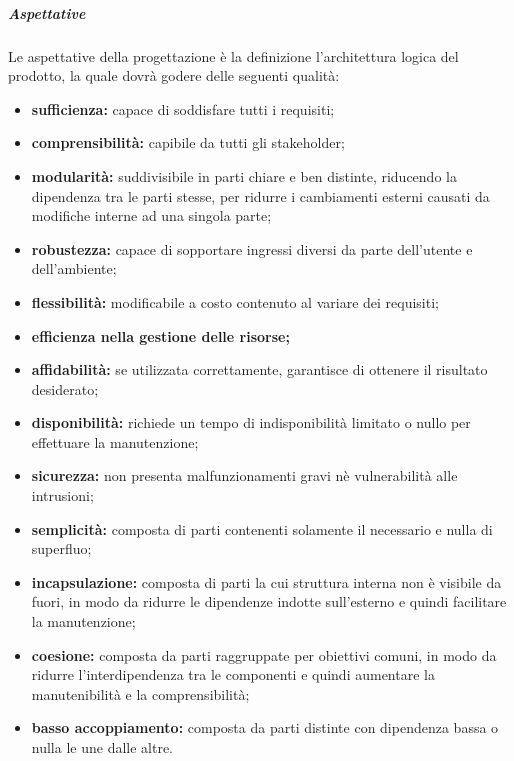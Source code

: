 				\subparagraph{Aspettative}
					Le aspettative della progettazione è la definizione l'architettura logica del prodotto, la quale dovrà godere delle seguenti qualità:
					\begin{itemize}
						\item \textbf{sufficienza:} capace di soddisfare tutti i requisiti;
						\item \textbf{comprensibilità:} capibile da tutti gli stakeholder;
						\item \textbf{modularità:} suddivisibile in parti chiare e ben distinte, riducendo la dipendenza tra le parti stesse, per ridurre i cambiamenti esterni causati da modifiche interne ad una singola parte;
						\item \textbf{robustezza:} capace di sopportare ingressi diversi da parte dell'utente e dell'ambiente;
						\item \textbf{flessibilità:} modificabile a costo contenuto al variare dei requisiti;
						\item \textbf{efficienza nella gestione delle risorse;}
						\item \textbf{affidabilità:} se utilizzata correttamente, garantisce di ottenere il risultato desiderato;
						\item \textbf{disponibilità:} richiede un tempo di indisponibilità limitato o nullo per effettuare la manutenzione;
						\item \textbf{sicurezza:} non presenta malfunzionamenti gravi nè vulnerabilità alle intrusioni;
						\item \textbf{semplicità:} composta di parti contenenti solamente il necessario e nulla di superfluo;
						\item \textbf{incapsulazione:} composta di parti la cui struttura interna non è visibile da fuori, in modo da ridurre le dipendenze indotte sull'esterno e quindi facilitare la manutenzione;
						\item \textbf{coesione:} composta da parti raggruppate per obiettivi comuni, in modo da ridurre l'interdipendenza tra le componenti e quindi aumentare la manutenibilità e la comprensibilità;
						\item \textbf{basso accoppiamento:} composta da parti distinte con dipendenza bassa o nulla le une dalle altre.
					\end{itemize}

